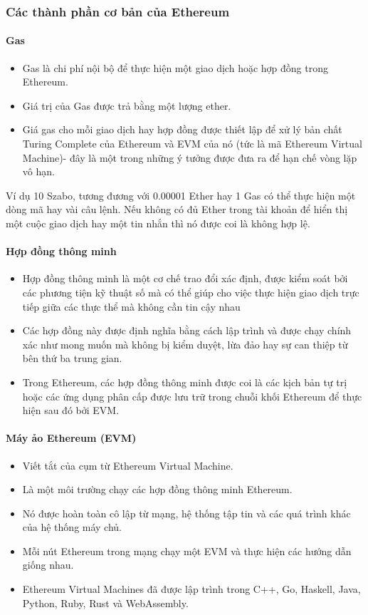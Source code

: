 \documentclass[12pt]{article}
\begin{document}
		\subsubsection{Các thành phần cơ bản của Ethereum}
		\paragraph{Gas}
		\begin{itemize}
			\item Gas là chi phí nội bộ để thực hiện một giao dịch hoặc hợp đồng trong Ethereum. 
			\item Giá trị của Gas được trả bằng một lượng ether.
			\item Giá gas cho mỗi giao dịch hay hợp đồng được thiết lập để xử lý bản chất Turing Complete của Ethereum và EVM của nó (tức là mã Ethereum Virtual Machine)- đây là một trong những ý tưởng được đưa ra để hạn chế vòng lặp vô hạn.
		\end{itemize}
		\indent Ví dụ 10 Szabo, tương đương với 0.00001 Ether hay 1 Gas có thể thực hiện một dòng mã hay vài câu lệnh. Nếu không có đủ Ether trong tài khoản để hiển thị một cuộc giao dịch hay một tin nhắn thì nó được coi là không hợp lệ.
		
		\paragraph{Hợp đồng thông minh}
		\begin{itemize}
			\item Hợp đồng thông minh là một cơ chế trao đổi xác định, được kiểm soát bởi các phương tiện kỹ thuật số mà có thể giúp cho việc thực hiện giao dịch trực tiếp giữa các thực thể mà không cần tin cậy nhau
			\item Các hợp đồng này được định nghĩa bằng cách lập trình và được chạy chính xác như mong muốn mà không bị kiểm duyệt, lừa đảo hay sự can thiệp từ bên thứ ba trung gian.
			\item Trong Ethereum, các hợp đồng thông minh được coi là các kịch bản tự trị hoặc các ứng dụng phân cấp được lưu trữ trong chuỗi khối Ethereum để thực hiện sau đó bởi EVM.
			
		\end{itemize}
		\paragraph{Máy ảo Ethereum (EVM)}
		\begin{itemize}
			\item Viết tắt của cụm từ Ethereum Virtual Machine. 
			\item Là một môi trường chạy các hợp đồng thông minh Ethereum.
			\item Nó được hoàn toàn cô lập từ mạng, hệ thống tập tin và các quá trình khác của hệ thống máy chủ.
			\item Mỗi nút Ethereum trong mạng chạy một EVM và thực hiện các hướng dẫn giống nhau.
			\item Ethereum Virtual Machines đã được lập trình trong C++, Go, Haskell, Java, Python, Ruby, Rust và WebAssembly.
			
		\end{itemize}
\end{document}
